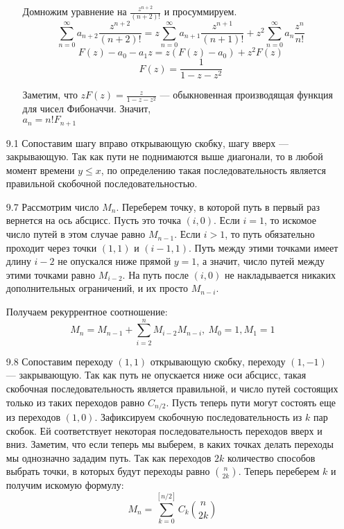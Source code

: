 \documentclass[10pt]{article}
\newcommand{\dsum}{\sum_{n=0}^\infty}
\begin{document}
\begin{enumerate}
\begin{itemize}
		Домножим уравнение на $\frac{z^{n+2}}{(n+2)!}$ и просуммируем.
		$$\dsum a_{n+2} \frac{z^{n+2}}{(n+2)!} = z \dsum a_{n+1} \frac{z^{n+1}}{(n+1)!} + z^2 \dsum a_n \frac{z^n}{n!}$$
		$$F(z) - a_0 - a_1z = z(F(z) - a_0) + z^2 F(z)$$
		$$F(z) = \frac{1}{1-z-z^2}$$
		
		Заметим, что $zF(z) = \frac{z}{1-z-z^2}$ --- обыкновенная производящая функция для чисел Фибоначчи. Значит,\\
		$a_n = n! F_{n+1}$
	\end{itemize}
	
	\item[9.1] Сопоставим шагу вправо открывающую скобку, шагу вверх --- закрывающую. Так как пути не поднимаются выше диагонали, то в любой момент времени $y \le x$, по определению такая последовательность является правильной скобочной последовательностью.
	
	\item[9.7] Рассмотрим число $M_n$. Переберем точку, в которой путь в первый раз вернется на ось абсцисс. Пусть это точка $(i, 0)$. Если $i=1$, то искомое число путей в этом случае равно $M_{n-1}$. Если $i>1$, то путь обязательно проходит через точки $(1, 1)$ и $(i-1, 1)$. Путь между этими точками имеет длину $i-2$ не опускался ниже прямой $y=1$, а значит, число путей между этими точками равно $M_{i-2}$. На путь после $(i, 0)$ не накладывается никаких дополнительных ограничений, и их просто $M_{n-i}$.
	
	Получаем рекуррентное соотношение:
	$$M_n = M_{n-1} + \sum_{i=2}^n M_{i-2} M_{n-i},\ M_0 = 1, M_1 = 1$$
	
	\item[9.8] Сопоставим переходу $(1, 1)$ открывающую скобку, переходу $(1, -1)$ --- закрывающую. Так как путь не опускается ниже оси абсцисс, такая скобочная последовательность является правильной, и число путей состоящих только из таких переходов равно $C_{n/2}$. Пусть теперь пути могут состоять еще из переходов $(1, 0)$. Зафиксируем скобочную последовательность из $k$ пар скобок. Ей соответствует некоторая последовательность переходов вверх и вниз. Заметим, что если теперь мы выберем, в каких точках делать переходы мы однозначно зададим путь. Так как переходов $2k$ количество способов выбрать точки, в которых будут переходы равно $\binom{n}{2k}$. Теперь переберем $k$ и получим искомую формулу:
	$$M_n = \sum_{k=0}^{[n/2]} C_k \binom{n}{2k}$$
\end{enumerate}
\end{document}
